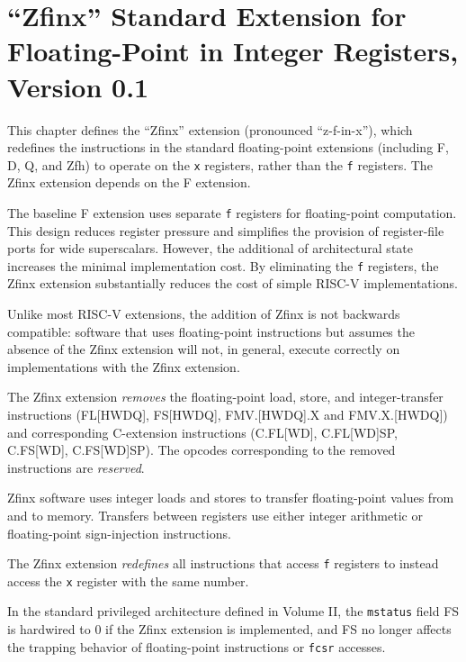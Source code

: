 \chapter{``Zfinx'' Standard Extension for Floating-Point in Integer Registers, Version 0.1}
\label{sec:zfinx}

This chapter defines the ``Zfinx'' extension (pronounced ``z-f-in-x''), which
redefines the instructions in the standard floating-point extensions
(including F, D, Q, and Zfh) to operate on the {\tt x} registers, rather than
the {\tt f} registers.
The Zfinx extension depends on the F extension.

\begin{commentary}
The baseline F extension uses separate {\tt f} registers for floating-point
computation.
This design reduces register pressure and simplifies the provision of
register-file ports for wide superscalars.
However, the additional  of architectural state increases the
minimal implementation cost.
By eliminating the {\tt f} registers, the Zfinx extension substantially
reduces the cost of simple RISC-V implementations.

Unlike most RISC-V extensions, the addition of Zfinx is not backwards
compatible: software that uses floating-point instructions but assumes the
absence of the Zfinx extension will not, in general, execute correctly on
implementations with the Zfinx extension.
\end{commentary}

The Zfinx extension {\em removes} the floating-point load, store, and
integer-transfer instructions (FL[HWDQ], FS[HWDQ], FMV.[HWDQ].X and
FMV.X.[HWDQ]) and corresponding C-extension instructions (C.FL[WD],
C.FL[WD]SP, C.FS[WD], C.FS[WD]SP).
The opcodes corresponding to the removed instructions are {\em reserved}.

\begin{commentary}
Zfinx software uses integer loads and stores to transfer floating-point values
from and to memory.
Transfers between registers use either integer arithmetic or floating-point
sign-injection instructions.
\end{commentary}

The Zfinx extension {\em redefines} all instructions that access {\tt f}
registers to instead access the {\tt x} register with the same number.

In the standard privileged architecture defined in Volume II, the
{\tt mstatus} field FS is hardwired to 0 if the Zfinx extension is
implemented, and FS no longer affects the trapping behavior of
floating-point instructions or {\tt fcsr} accesses.

